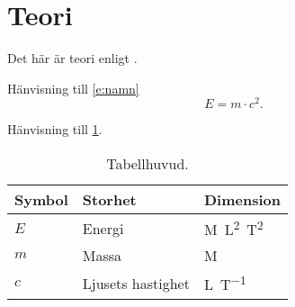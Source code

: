 \section{Teori} \label{s:teori}
%
Det här är teori enligt \textcite{einstein}. \n

Hänvisning till \cref{e:namn}
\begin{equation} \label{e:namn}
    E=m \cdot c^2.
\end{equation}

Hänvisning till \cref{t:namn}.
\begin{table}[H]
\centering
\caption{Tabellhuvud.}
\begin{tabular}{@{} l l l @{}} \toprule
\textbf{Symbol} & \textbf{Storhet} & \textbf{Dimension} \\
\midrule
    $E$ & Energi & \si{M.L^2.T^{2}} \\
    $m$ & Massa &\si{M} \\
    $c$ & Ljusets hastighet & \si{L.T^{-1}} \\
\bottomrule 
\end{tabular} \label{t:namn}
\end{table}

